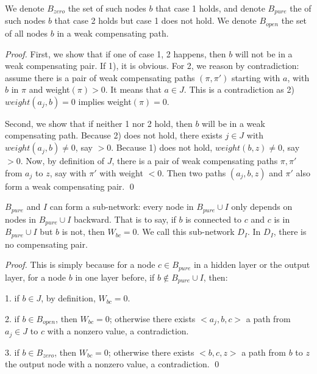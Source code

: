			We denote $B_{zero}$ the set of such nodes $b$ that case 1 holds, and denote $B_{pure}$ the of such nodes $b$ that case 2 holds but case 1 does not hold.	We denote $B_{open}$ the set of all nodes $b$ in a weak compensating path.
			
			\begin{proof}
				First, we show that if one of case 1, 2 happens, then $b$ will not be in a weak compensating pair. If 1), it is obvious. For 2, we reason by contradiction: assume there is a pair of weak compensating paths 	$(\pi,\pi')$ starting with $a$, with $b$ in $\pi$ and weight$(\pi) > 0$. It means that $a \in J$. This is a contradiction as 2) $weight({a_j,b})=0$ implies weight$(\pi)=0$.
				
				Second, we show that if neither 1 nor 2 hold, then $b$ will be in a weak compensating path.
				Because 2) does not hold, there exists $j \in J$ with $weight({a_j,b}) \neq 0$, say $>0$.
				Because 1) does not hold, $weight({b,z}) \neq 0$, say $>0$.
				Now, by definition of $J$, there is a pair of weak compensating paths $\pi,\pi'$ 
				from $a_j$ to $z$, say with $\pi'$ with weight $<0$.
				Then two paths $(a_j,b,z)$ and $\pi'$ also form a weak compensating pair. \qed
			\end{proof}
			
			\begin{lemma}\label{lem:subnetwork}
				$B_{pure}$ and $I$ can form a sub-network: every node in $B_{pure}\cup I$ only depends on nodes in $B_{pure}\cup I$ backward. That is to say, if $b$ is connected to $c$ and $c$ is in $B_{pure}\cup I$ but $b$ is not, then $W_{bc}=0$. We call this sub-network $D_I$. In $D_I$, there is no compensating pair.
			\end{lemma}
			
			\begin{proof}
				This is simply because for a node $c\in B_{pure}$ in a hidden layer or the output layer, for a node $b$ in one layer before, if $b\notin B_{pure}\cup I$, then:
				
				1. if $b\in J$, by definition, $W_{bc}=0$.
				
				2. if $b\in B_{open}$, then $W_{bc}=0$; otherwise there exists $<a_j,b,c>$ a path from $a_j\in J$ to $c$ with a nonzero value, a contradiction.
				
				3. if $b\in B_{zero}$, then $W_{bc}=0$; otherwise there exists $<b,c,z>$ a path from $b$ to $z$ the output node with a nonzero value, a contradiction. \qed
			\end{proof}
			
